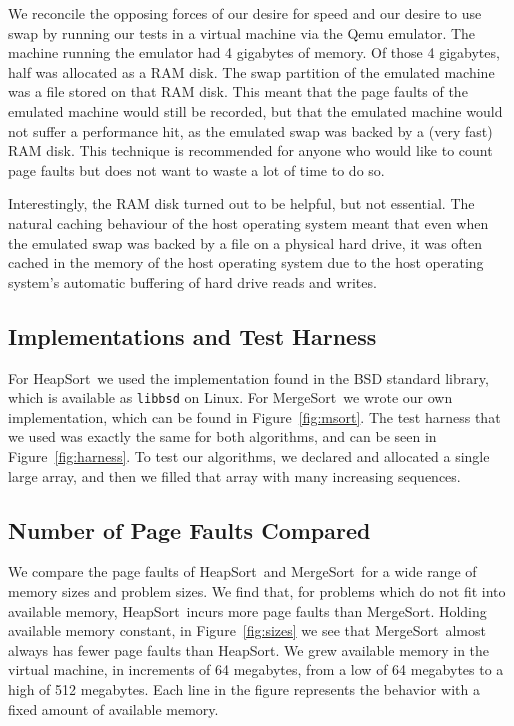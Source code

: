 \documentclass[11pt]{article}
\newcommand{\heapsort}{{\sc HeapSort}}
\newcommand{\mergesort}{{\sc MergeSort}}
\begin{document}
We reconcile the opposing forces of our desire for speed and our desire to use
swap by running our tests in a virtual machine via the Qemu emulator.  The
machine running the emulator had 4 gigabytes of memory.  Of those 4 gigabytes,
half was allocated as a RAM disk.  The swap partition of the emulated machine
was a file stored on that RAM disk.  This meant that the page faults of the
emulated machine would still be recorded, but that the emulated machine would
not suffer a performance hit, as the emulated swap was backed by a (very fast)
RAM disk.  This technique is recommended for anyone who would like to count
page faults but does not want to waste a lot of time to do so.

Interestingly, the RAM disk turned out to be helpful, but not essential. The
natural caching behaviour of the host operating system meant that even when the
emulated swap was backed by a file on a physical hard drive, it was often
cached in the memory of the host operating system due to the host operating
system's automatic buffering of hard drive reads and writes.

\subsection{Implementations and Test Harness}

For \heapsort\ we used the implementation found in the BSD standard library,
which is available as {\tt libbsd} on Linux.  For \mergesort\ we wrote our own
implementation, which can be found in Figure~\ref{fig:msort}.  The test harness
that we used was exactly the same for both algorithms, and can be seen in
Figure~\ref{fig:harness}.  To test our algorithms, we declared and allocated a
single large array, and then we filled that array with many increasing
sequences.


\subsection{Number of Page Faults Compared}

We compare the page faults of \heapsort\ and \mergesort\ for a wide range of memory sizes and problem sizes.  We find that, for problems which do not fit into available memory, \heapsort\ incurs more page faults than \mergesort.  Holding available memory constant, in Figure~\ref{fig:sizes} we see that \mergesort\ almost always has fewer page faults than \heapsort.  We grew available memory in the virtual machine, in increments of 64 megabytes, from a low of 64 megabytes to a high of 512 megabytes.  Each line in the figure represents the behavior with a fixed amount of available memory.
\end{document}
